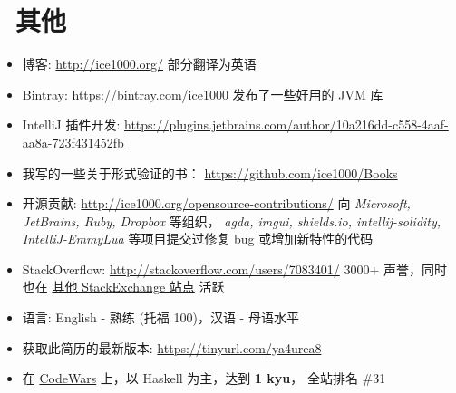\documentclass{resume}
\begin{document}
\section{\faInfo\ 其他}
\begin{itemize}[parsep=0.25ex]
  \item 博客: \url{http://ice1000.org/} 部分翻译为英语
  \item Bintray: \url{https://bintray.com/ice1000} 发布了一些好用的 JVM 库
  \item IntelliJ 插件开发: \url{https://plugins.jetbrains.com/author/10a216dd-c558-4aaf-aa8a-723f431452fb}
  \item 我写的一些关于形式验证的书： \url{https://github.com/ice1000/Books}
  \item 开源贡献: \url{http://ice1000.org/opensource-contributions/}
    向 \textit{Microsoft, JetBrains, Ruby, Dropbox} 等组织，
    \textit{agda, imgui, shields.io, intellij-solidity, IntelliJ-EmmyLua} 等项目提交过修复 bug 或增加新特性的代码
  \item StackOverflow: \url{http://stackoverflow.com/users/7083401/}
    3000+ 声誉，同时也在 \href{https://stackexchange.com/users/9532102/} {其他 StackExchange 站点} 活跃
  \item 语言: English - 熟练 (托福 100)，汉语 - 母语水平
  \item 获取此简历的最新版本: \url{https://tinyurl.com/ya4urea8}
  \item 在
    \href{https://www.codewars.com/users/ice1000} {CodeWars}
    上，以 Haskell 为主，达到
    \textbf{1 kyu}，
    全站排名 \#31
\end{itemize}

%
%
\end{document}
